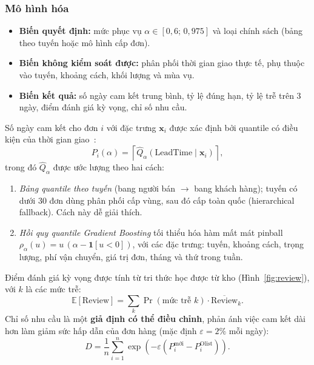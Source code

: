 \documentclass[a4paper]{article}
\begin{document}
\subsubsection{Mô hình hóa}
\begin{itemize}
    \item \textbf{Biến quyết định:} mức phục vụ $\alpha \in [0{,}6;\, 0{,}975]$ và loại chính sách (bảng theo tuyến hoặc mô hình cấp đơn).
    \item \textbf{Biến không kiểm soát được:} phân phối thời gian giao thực tế, phụ thuộc vào tuyến, khoảng cách, khối lượng và mùa vụ.
    \item \textbf{Biến kết quả:} số ngày cam kết trung bình, tỷ lệ đúng hạn, tỷ lệ trễ trên 3 ngày, điểm đánh giá kỳ vọng, chỉ số nhu cầu.
\end{itemize}
Số ngày cam kết cho đơn $i$ với đặc trưng $\mathbf{x}_i$ được xác định bởi quantile có điều kiện của thời gian giao~\cite{koenker1978}:
\begin{equation}
P_i(\alpha) = \left\lceil \hat{Q}_\alpha\!\left(\text{LeadTime} \mid \mathbf{x}_i\right) \right\rceil ,
\end{equation}
trong đó $\hat{Q}_\alpha$ được ước lượng theo hai cách:
\begin{enumerate}[label=(\roman*)]
    \item \textit{Bảng quantile theo tuyến} (bang người bán $\rightarrow$ bang khách hàng); tuyến có dưới 30 đơn dùng phân phối cấp vùng, sau đó cấp toàn quốc (hierarchical fallback). Cách này dễ giải thích.
    \item \textit{Hồi quy quantile Gradient Boosting} tối thiểu hóa hàm mất mát pinball $\rho_\alpha(u) = u\,(\alpha - \mathbf{1}[u<0])$, với các đặc trưng: tuyến, khoảng cách, trọng lượng, phí vận chuyển, giá trị đơn, tháng và thứ trong tuần.
\end{enumerate}
Điểm đánh giá kỳ vọng được tính từ tri thức học được từ kho (Hình~\ref{fig:review}), với $k$ là các mức trễ:
\begin{equation}
\mathbb{E}[\text{Review}] = \sum_{k} \Pr(\text{mức trễ } k) \cdot \overline{\text{Review}}_k .
\end{equation}
Chỉ số nhu cầu là một \textbf{giả định có thể điều chỉnh}, phản ánh việc cam kết dài hơn làm giảm sức hấp dẫn của đơn hàng (mặc định $\varepsilon = 2\%$ mỗi ngày):
\begin{equation}
D = \frac{1}{n}\sum_{i=1}^{n} \exp\!\left(-\varepsilon \left(P_i^{\text{mới}} - P_i^{\text{Olist}}\right)\right).
\end{equation}
\end{document}
